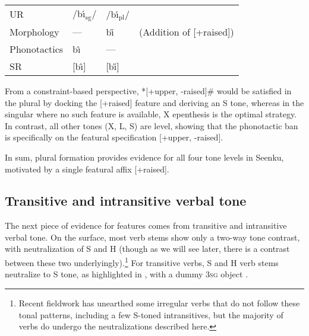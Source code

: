 \documentclass[output=paper]{langsci/langscibook}
\begin{document}
\ea\label{ex:mcpherson:10} \begin{tabular}[t]{llll}
UR & /b\'{\i}$_{\text{sg}}$/ & /b\'{\i}$_{\text{pl}}$/ & \\
Morphology & --- & b\H{\i} & (Addition of [+raised]) \\
Phonotactics & b\^{\i} & --- & \\
SR & [b\^{\i}] & [b\H{\i}] \\
\end{tabular}
\z 

From a constraint-based perspective, *[+upper, -raised]\# would be satisfied in the plural by docking the [+raised] feature and deriving an S tone, whereas in the singular where no such feature is available, X epenthesis is the optimal strategy. In contrast, all other tones (X, L, S) are level, showing that the phonotactic ban is specifically on the featural specification [+upper, -raised]. 

In sum, plural formation provides evidence for all four tone levels in Seenku, motivated by a single featural affix [+raised].

\subsection{Transitive and intransitive verbal tone}\label{sec:mcpherson:SecTransitive}

The next piece of evidence for features comes from transitive and intransitive verbal tone. On the surface, most verb stems show only a two-way tone contrast, with neutralization of S and H (though as we will see later, there is a contrast between these two underlyingly).\footnote{Recent fieldwork has unearthed some irregular verbs that do not follow these tonal patterns, including a few S-toned intransitives, but the majority of verbs do undergo the neutralizations described here.} For transitive verbs, S and H verb stems neutralize to S tone, as highlighted in , with a dummy 3\textsc{sg} object {\it {}}.
\end{document}
